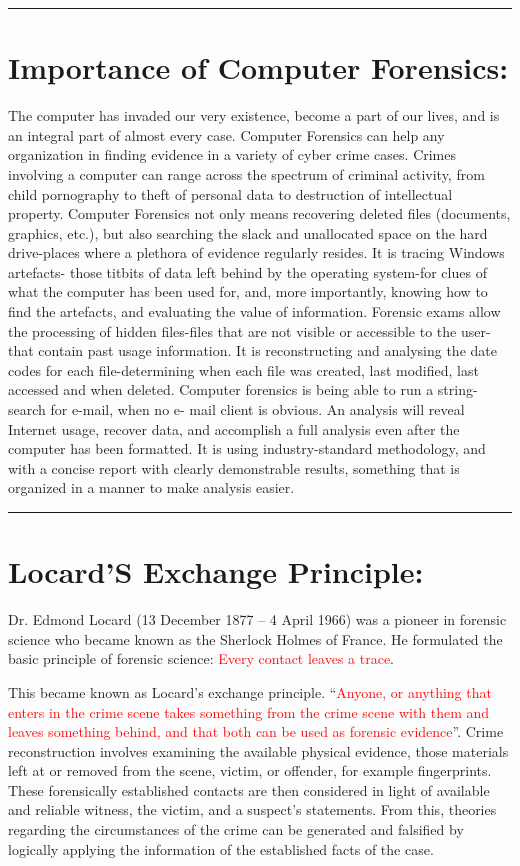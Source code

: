 \documentclass[british]{article}
\begin{document}
\rule[0.5ex]{0.75\columnwidth}{1pt}

\section{Importance of Computer Forensics:}

The computer has invaded our very existence, become a part of our
lives, and is an integral part of almost every case. Computer Forensics
can help any organization in finding evidence in a variety of cyber
crime cases. Crimes involving a computer can range across the spectrum
of criminal activity, from child pornography to theft of personal
data to destruction of intellectual property. Computer Forensics not
only means recovering deleted files (documents, graphics, etc.), but
also searching the slack and unallocated space on the hard drive-places
where a plethora of evidence regularly resides. It is tracing Windows
artefacts- those titbits of data left behind by the operating system-for
clues of what the computer has been used for, and, more importantly,
knowing how to find the artefacts, and evaluating the value of information.
Forensic exams allow the processing of hidden files-files that are
not visible or accessible to the user-that contain past usage information.
It is reconstructing and analysing the date codes for each file-determining
when each file was created, last modified, last accessed and when
deleted. Computer forensics is being able to run a string-search for
e-mail, when no e- mail client is obvious. An analysis will reveal
Internet usage, recover data, and accomplish a full analysis even
after the computer has been formatted. It is using industry-standard
methodology, and with a concise report with clearly demonstrable results,
something that is organized in a manner to make analysis easier.

\rule[0.5ex]{0.75\columnwidth}{1pt}

\section{Locard\textquoteright S Exchange Principle:}

Dr. Edmond Locard (13 December 1877 -- 4 April 1966) was a pioneer
in forensic science who became known as the \textquotedbl Sherlock
Holmes of France\textquotedbl . He formulated the basic principle
of forensic science: \textquotedbl\textcolor{red}{Every contact leaves
	a trace}\textquotedbl .

This became known as Locard's exchange principle. ``\textcolor{red}{Anyone,
	or anything that enters in the crime scene takes something from the
	crime scene with them and leaves something behind, and that both can
	be used as forensic evidence}''. Crime reconstruction involves examining
the available physical evidence, those materials left at or removed
from the scene, victim, or offender, for example fingerprints. These
forensically established contacts are then considered in light of
available and reliable witness, the victim, and a suspect's statements.
From this, theories regarding the circumstances of the crime can be
generated and falsified by logically applying the information of the
established facts of the case.
\end{document}
